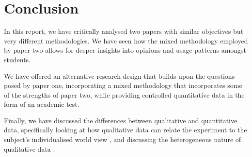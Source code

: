 \documentclass[12pt]{article}
\begin{document}
\section{Conclusion}


In this report, we have critically analysed two papers with similar objectives but very different methodologies. We have seen how the mixed methodology employed by paper two allows for deeper insights into opinions and usage patterns amongst students. 

We have offered an alternative research design that builds upon the questions posed by paper one, incorporating a mixed methodology that incorporates some of the strengths of paper two, while providing controlled quantitative data in the form of an academic test.

Finally, we have discussed the differences between qualitative and quantitative data, specifically looking at how qualitative data can relate the experiment to the subject's individualised world view \cite{mertens}, and discussing the heterogeneous nature of qualitative data \cite{allwood}.


\medskip




\end{document}
